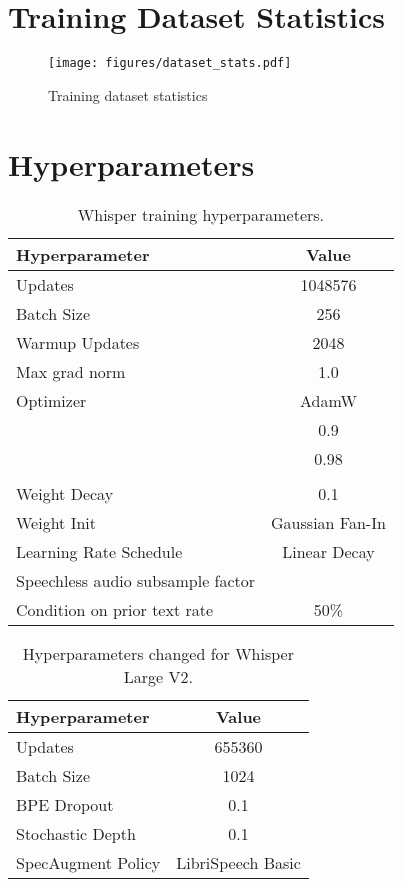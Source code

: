 \documentclass[nohyperref]{article}
\theoremstyle{plain}
\theoremstyle{definition}
\theoremstyle{remark}
\begin{document}
\vfill
\pagebreak

\section{Training Dataset Statistics}



\begin{figure}[h!]
\begin{center}
\centerline{\texttt{[image: figures/dataset\_stats.pdf]}}
\caption{Training dataset statistics}
\label{dataset_stats}
\end{center}
\vspace{-1em}
\end{figure}


\vfill
\pagebreak


\section{Hyperparameters}\label{sec:hyperparameters}

\begin{table}[H]
\centering
\begin{tabular}{l|c} \toprule
    Hyperparameter & Value \\
    \midrule
    Updates & 1048576 \\
    Batch Size & 256 \\
    Warmup Updates & 2048 \\
    Max grad norm & 1.0 \\
    Optimizer & AdamW \\
     & 0.9 \\
     & 0.98 \\
     &  \\
    Weight Decay & 0.1 \\
    Weight Init & Gaussian Fan-In \\
    Learning Rate Schedule & Linear Decay \\
    Speechless audio subsample factor &  \\
    Condition on prior text rate & 50\% \\
    \bottomrule
\end{tabular}
\caption{Whisper training hyperparameters.}\label{tab:hyperparams-training}
\end{table}

\begin{table}[H]
\centering
\begin{tabular}{l|c} \toprule
    Hyperparameter & Value \\
    \midrule
    Updates & 655360 \\
    Batch Size & 1024 \\
    BPE Dropout & 0.1 \\
    Stochastic Depth & 0.1 \\
    SpecAugment Policy & LibriSpeech Basic \\
    \bottomrule
\end{tabular}
\caption{Hyperparameters changed for Whisper Large V2.}\label{tab:hyperparams-training2}
\end{table}
\end{document}
